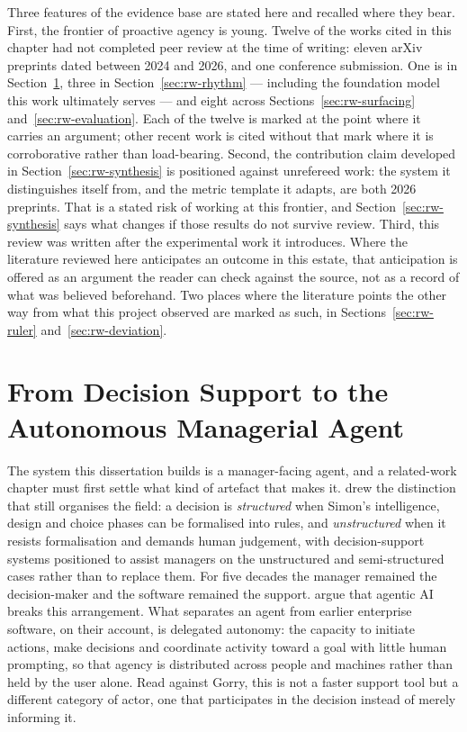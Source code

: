 Three features of the evidence base are stated here and recalled where they
bear. First, the frontier of proactive agency is young. Twelve of the works
cited in this chapter had not completed peer review at the time of writing:
eleven arXiv preprints dated between 2024 and 2026, and one conference
submission. One is in Section~\ref{sec:rw-framing}, three in
Section~\ref{sec:rw-rhythm} --- including the foundation model this work
ultimately serves --- and eight across Sections~\ref{sec:rw-surfacing}
and~\ref{sec:rw-evaluation}. Each of the twelve is marked at the point where it
carries an argument; other recent work is cited without that mark where it is
corroborative rather than load-bearing. Second, the contribution claim
developed in Section~\ref{sec:rw-synthesis} is positioned against unrefereed
work: the system it distinguishes itself from, and the metric template it
adapts, are both 2026 preprints. That is a stated risk of working at this
frontier, and Section~\ref{sec:rw-synthesis} says what changes if those results
do not survive review. Third, this review was written after the experimental
work it introduces. Where the literature reviewed here anticipates an outcome
in this estate, that anticipation is offered as an argument the reader can
check against the source, not as a record of what was believed beforehand. Two
places where the literature points the other way from what this project
observed are marked as such, in Sections~\ref{sec:rw-ruler}
and~\ref{sec:rw-deviation}.

\section{From Decision Support to the Autonomous Managerial Agent}
\label{sec:rw-framing}

The system this dissertation builds is a manager-facing agent, and a
related-work chapter must first settle what kind of artefact that makes it.
\citet{gorry_framework_1971} drew the distinction that
still organises the field: a decision is \emph{structured} when Simon's
intelligence, design and choice phases can be formalised into rules, and
\emph{unstructured} when it resists formalisation and demands human judgement,
with decision-support systems positioned to assist managers on the
unstructured and semi-structured cases rather than to replace them. For five
decades the manager remained the decision-maker and the software remained the
support. \citet{kumar_agentic_2026} argue that agentic AI breaks
this arrangement. What separates an agent from earlier enterprise software,
on their account, is delegated autonomy: the capacity to initiate actions,
make decisions and coordinate activity toward a goal with little human
prompting, so that agency is distributed across people and machines rather
than held by the user alone. Read against Gorry, this is not a faster support
tool but a different category of actor, one that participates in the decision
instead of merely informing it.

